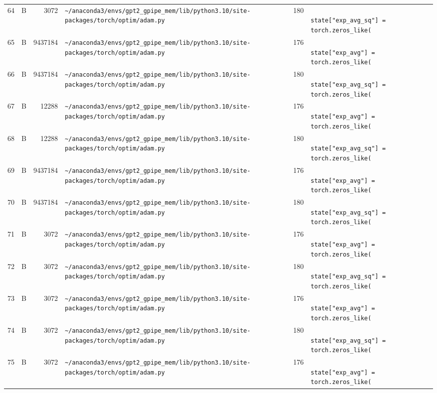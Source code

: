\documentclass{article}
\begin{document}
\begin{longtable}{r l r p{6.5cm} r p{7.0cm}}
64 & B & 3072 & \lstinline|~/anaconda3/envs/gpt2_gpipe_mem/lib/python3.10/site-packages/torch/optim/adam.py| & 180 & \lstinline|                    state["exp_avg_sq"] = torch.zeros_like(| \\
65 & B & 9437184 & \lstinline|~/anaconda3/envs/gpt2_gpipe_mem/lib/python3.10/site-packages/torch/optim/adam.py| & 176 & \lstinline|                    state["exp_avg"] = torch.zeros_like(| \\
66 & B & 9437184 & \lstinline|~/anaconda3/envs/gpt2_gpipe_mem/lib/python3.10/site-packages/torch/optim/adam.py| & 180 & \lstinline|                    state["exp_avg_sq"] = torch.zeros_like(| \\
67 & B & 12288 & \lstinline|~/anaconda3/envs/gpt2_gpipe_mem/lib/python3.10/site-packages/torch/optim/adam.py| & 176 & \lstinline|                    state["exp_avg"] = torch.zeros_like(| \\
68 & B & 12288 & \lstinline|~/anaconda3/envs/gpt2_gpipe_mem/lib/python3.10/site-packages/torch/optim/adam.py| & 180 & \lstinline|                    state["exp_avg_sq"] = torch.zeros_like(| \\
69 & B & 9437184 & \lstinline|~/anaconda3/envs/gpt2_gpipe_mem/lib/python3.10/site-packages/torch/optim/adam.py| & 176 & \lstinline|                    state["exp_avg"] = torch.zeros_like(| \\
70 & B & 9437184 & \lstinline|~/anaconda3/envs/gpt2_gpipe_mem/lib/python3.10/site-packages/torch/optim/adam.py| & 180 & \lstinline|                    state["exp_avg_sq"] = torch.zeros_like(| \\
71 & B & 3072 & \lstinline|~/anaconda3/envs/gpt2_gpipe_mem/lib/python3.10/site-packages/torch/optim/adam.py| & 176 & \lstinline|                    state["exp_avg"] = torch.zeros_like(| \\
72 & B & 3072 & \lstinline|~/anaconda3/envs/gpt2_gpipe_mem/lib/python3.10/site-packages/torch/optim/adam.py| & 180 & \lstinline|                    state["exp_avg_sq"] = torch.zeros_like(| \\
73 & B & 3072 & \lstinline|~/anaconda3/envs/gpt2_gpipe_mem/lib/python3.10/site-packages/torch/optim/adam.py| & 176 & \lstinline|                    state["exp_avg"] = torch.zeros_like(| \\
74 & B & 3072 & \lstinline|~/anaconda3/envs/gpt2_gpipe_mem/lib/python3.10/site-packages/torch/optim/adam.py| & 180 & \lstinline|                    state["exp_avg_sq"] = torch.zeros_like(| \\
75 & B & 3072 & \lstinline|~/anaconda3/envs/gpt2_gpipe_mem/lib/python3.10/site-packages/torch/optim/adam.py| & 176 & \lstinline|                    state["exp_avg"] = torch.zeros_like(| \\

\end{longtable}
\end{document}
